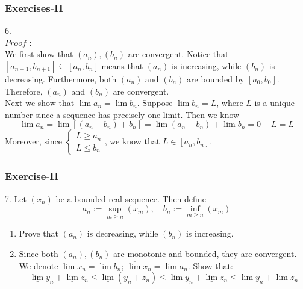 \documentclass[12pt, t]{beamer}
\begin{document}
\begin{frame}
    \frametitle{Exercises-II}
    6.\\
    $Proof$ : \\
    \hspace{1em} We first show that $(a_n),(b_n)$ are convergent. Notice that $[a_{n+1}, b_{n+1}]\subseteq [a_n,b_n]$
    means that $(a_n)$ is increasing, while $(b_n)$ is decreasing. Furthermore, both $(a_n)$ and $(b_n)$ are bounded by
    $[a_0,b_0]$. Therefore, $(a_n)$ and $(b_n)$ are convergent.\\
    \hspace{1em} Next we show that $\lim a_n=\lim b_n$. Suppose $\lim b_n=L$, where $L$ is a unique number since a sequence
    has precisely one limit. Then we know
    \begin{equation*}
        \lim a_n=\lim [(a_n-b_n)+b_n]=\lim (a_n-b_n) + \lim b_n= 0+L=L
    \end{equation*}
    Moreover, since
    $\begin{cases}
            L \geq a_n \\
            L \leq b_n
        \end{cases}$, we know that $L\in [a_n,b_n]$.

\end{frame}

\begin{frame}
    \frametitle{Exercise-II}
    7. Let $(x_n)$ be a bounded real sequence. Then define
    \begin{equation*}
        a_n:=\sup_{m\geq n}(x_m),\quad b_n:=\inf_{m\geq n}(x_m)
    \end{equation*}

    \begin{enumerate}
        \item Prove that $(a_n)$ is decreasing, while $(b_n)$ is increasing.
        \item Since both $(a_n),(b_n)$ are monotonic and bounded, they are convergent.
              We denote $\underline{\lim} x_n=\lim b_n$; $\overline{\lim}x_n=\lim a_n$. Show that:
              \begin{equation*}
                  \underline{\lim}y_n+\underline{\lim}z_n\leq \underline{\lim} (y_n+z_n)\leq\overline{\lim}y_n+\underline{\lim}z_n\leq\overline{\lim}y_n+\overline{\lim}z_n
              \end{equation*}
    \end{enumerate}
\end{frame}
\end{document}
